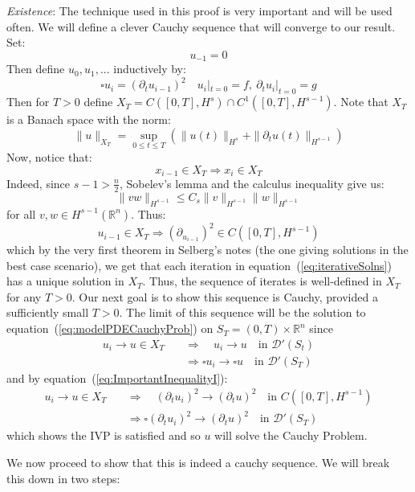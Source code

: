 \documentclass{book}
\newenvironment{Proof}[1][]
  {\begin{ProofTcb}[#1]}
  {\end{ProofTcb}}
\newcommand{\R}{{\mathbb{R}}}
\newcommand{\CD}{{\mathcal{D}}}
\newcommand{\rw}{\rightarrow}
\newcommand{\Rw}{\Rightarrow}
\begin{document}
\begin{Proof}
	\emph{Existence}: The technique used in this proof is very important and will be used often. We will define a clever
	Cauchy sequence that will converge to our result. Set:
	\[
		u_{-1} = 0
	\]
	Then define $u_0, u_1, ...$ inductively by:
	\begin{equation}\label{eq:iterativeSolns}
	  \square u_i = (  \partial_t u_{i-1} )^2 \quad u_i|_{t=0} = f,\  \partial_t u_i|_{t=0} = g
	\end{equation}
	Then for $T > 0$ define $X_T = C([0,T], H^s)\cap C^1([0,T], H^{s-1})$. Note that $X_T$ is a Banach space with the
	norm:
	\[
		\|u\|_{X_T} = \sup_{0 \le t \le T} (\|u(t)\|_{H^s} + \|  \partial_t u(t)\|_{H^{s-1}})
	\]
	Now, notice that:
	\[
		x_{i-1} \in X_T \Rw x_i \in X_T
	\]
	Indeed, since $s-1 > \frac{n}{2}$, Sobelev's lemma and the calculus inequality give us:
	\begin{equation}\label{eq:ImportantInequalityI}
	  \|vw\|_{H^{s-1}} \le C_s \|v\|_{H^{s-1}}\|w\|_{H^{s-1}}
	\end{equation}
	for all $v,w \in H^{s-1}(\R^n)$. Thus:
	\[
		u_{i-1} \in X_T \Rw (  \partial_{u_{i-1}} )^2 \in C([0,T], H^{s-1})
	\]
	which by the very first theorem in Selberg's notes (the one giving solutions in the best case scenario), we get that
	each iteration in equation~(\ref{eq:iterativeSolns}) has a unique solution in $X_T$. Thus, the sequence of iterates
	is well-defined in $X_T$ for any $T > 0$. Our next goal is to show this sequence is Cauchy, provided a sufficiently
	small $T > 0$. The limit of this sequence will be the solution to equation~(\ref{eq:modelPDECauchyProb}) on $S_T
	= (0, T)\times \R^n$ since
	\begin{align*}
		u_i \rw u \in X_T \quad &\Rw \quad u_i \rw u \quad\text{in $\CD'(S_t)$}\\
								&\Rw \square u_i \rw \square u \quad\text{in $\CD'(S_T)$}
	\end{align*}
	and by equation~(\ref{eq:ImportantInequalityI}):
	\begin{align*}
		u_i \rw u \in X_T \quad &\Rw \quad  (\partial_tu_i)^2 \rw (\partial_tu)^2 \quad\text{in $C([0,T], H^{s-1})$}\\
								&\Rw \square (\partial_tu_i)^2 \rw (\partial_tu)^2 \quad\text{in $\CD'(S_T)$}
	\end{align*}
	which shows the IVP is satisfied and so $u$ will solve the Cauchy Problem.

	We now proceed to show that this is indeed a cauchy sequence. We will break this down in two steps:


\end{Proof}
\end{document}
